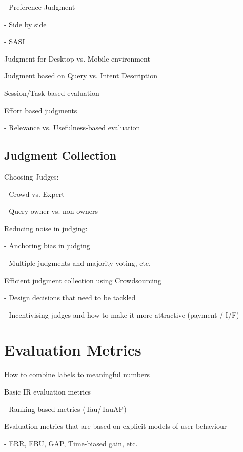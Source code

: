 \documentclass[openany]{now} %
\newcommand{\newpar}{\bigskip\noindent}
\begin{document}
- Preference Judgment  \cite{Chandar2013} \cite{CarteretteBCD08}

- Side by side \cite{Thomas2006} \cite{Kim:2013}

- SASI \cite{Bailey2010} 

\newpar
Judgment for Desktop vs. Mobile environment \cite{Verma:2016:CRMD}

\newpar
Judgment based on Query vs. Intent Description \cite{Yilmaz:2014:EID}

\newpar
Session/Task-based evaluation \cite{Moraveji:2011} \cite{Xu:2009}

\newpar
Effort based judgments \cite{Yilmaz:2014} \cite{Verma:2016:EBJ}

- Relevance vs. Usefulness-based evaluation 

\section{Judgment Collection}

Choosing Judges: 

- Crowd vs. Expert \cite{Kazai:2013} \cite{Alonso20121053}

- Query owner vs. non-owners \cite{Chouldechova:2013}

\newpar
Reducing noise in judging: 

- Anchoring bias in judging \cite{Shokouhi:2015}

- Multiple judgments and majority voting, etc. \cite{Venanzi:2014}

\newpar
Efficient judgment collection using Crowdsourcing

-	Design decisions that need to be tackled  \cite{Blanco:2011} \cite{Kazai2012} \cite{Alonso2012} \cite{Alonso:2015} \cite{Scholer:2013} 

-	Incentivising judges and how to make it more attractive (payment / I/F)
\cite{Megorskaya2015} \cite{Davtyan2015}  \cite{Rokicki:2014}  \cite{Eickhoff:2012}

\chapter{Evaluation Metrics}
How to combine labels to meaningful numbers


Basic IR evaluation metrics

-	Ranking-based metrics (Tau/TauAP)

\newpar
Evaluation metrics that are based on explicit models of user behaviour

-	ERR, EBU, GAP, Time-biased gain, etc.
\end{document}
